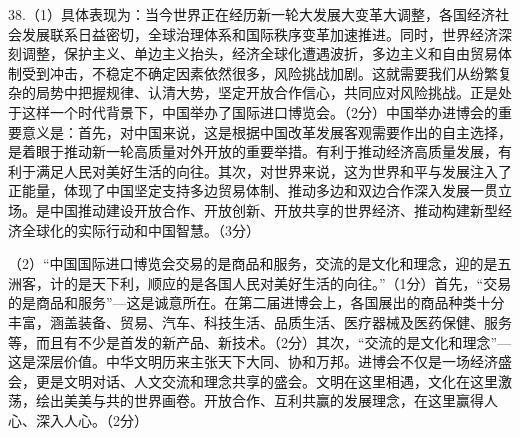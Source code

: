 \documentclass[UTF8,11pt]{ctexart}
\begin{document}
38.（1）具体表现为：当今世界正在经历新一轮大发展大变革大调整，各国经济社会发展联系日益密切，全球治理体系和国际秩序变革加速推进。同时，世界经济深刻调整，保护主义、单边主义抬头，经济全球化遭遇波折，多边主义和自由贸易体制受到冲击，不稳定不确定因素依然很多，风险挑战加剧。这就需要我们从纷繁复杂的局势中把握规律、认清大势，坚定开放合作信心，共同应对风险挑战。正是处于这样一个时代背景下，中国举办了国际进口博览会。（2分）中国举办进博会的重要意义是：首先，对中国来说，这是根据中国改革发展客观需要作出的自主选择，是着眼于推动新一轮高质量对外开放的重要举措。有利于推动经济高质量发展，有利于满足人民对美好生活的向往。其次，对世界来说，这为世界和平与发展注入了正能量，体现了中国坚定支持多边贸易体制、推动多边和双边合作深入发展一贯立场。是中国推动建设开放合作、开放创新、开放共享的世界经济、推动构建新型经济全球化的实际行动和中国智慧。（3分）


（2）“中国国际进口博览会交易的是商品和服务，交流的是文化和理念，迎的是五洲客，计的是天下利，顺应的是各国人民对美好生活的向往。”（1分）首先，“交易的是商品和服务”—这是诚意所在。在第二届进博会上，各国展出的商品种类十分丰富，涵盖装备、贸易、汽车、科技生活、品质生活、医疗器械及医药保健、服务等，而且有不少是首发的新产品、新技术。（2分）其次，“交流的是文化和理念”—这是深层价值。中华文明历来主张天下大同、协和万邦。进博会不仅是一场经济盛会，更是文明对话、人文交流和理念共享的盛会。文明在这里相遇，文化在这里激荡，绘出美美与共的世界画卷。开放合作、互利共赢的发展理念，在这里赢得人心、深入人心。（2分）
\end{document}
